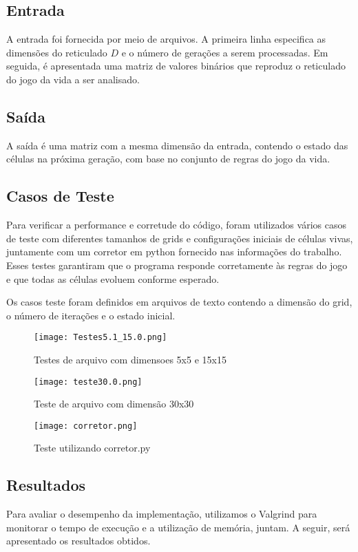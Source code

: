\documentclass[a4paper,12pt]{article}
\begin{document}
\subsection{Entrada}
A entrada foi fornecida por meio de arquivos. A primeira linha especifica as dimensões do reticulado \(D\) e o número de gerações a serem processadas. Em seguida, é apresentada uma matriz de valores binários que reproduz o reticulado do jogo da vida a ser analisado.

\subsection{Saída}
A saída é uma matriz com a mesma dimensão da entrada, contendo o estado das células na próxima geração, com base no conjunto de regras do jogo da vida.

\subsection{Casos de Teste}
Para verificar a performance e corretude do código, foram utilizados vários casos de teste com diferentes tamanhos de grids e configurações iniciais de células vivas, juntamente com um corretor em python fornecido nas informações do trabalho. Esses testes garantiram que o programa responde corretamente às regras do jogo e que todas as células evoluem conforme esperado.

Os casos teste foram definidos em arquivos de texto contendo a dimensão do grid, o número de iterações e o estado inicial.

\begin{figure}[H]
        \centering
        \texttt{[image: Testes5.1\_15.0.png]}
        \caption{Testes de arquivo com dimensoes 5x5 e 15x15}
        \label{fig:enter-label6}
 \end{figure}

\begin{figure} [H]
    \centering
    \texttt{[image: teste30.0.png]}
    \caption{Teste de arquivo com dimensão 30x30}
    \label{fig:enter-label7}
\end{figure}

\begin{figure}[H]
        \centering
        \texttt{[image: corretor.png]}
        \caption{Teste utilizando corretor.py}
        \label{fig:enter-label16}
\end{figure}


\subsection{Resultados}
Para avaliar o desempenho da implementação, utilizamos o Valgrind para monitorar o tempo de execução e a utilização de memória, juntam. A seguir, será apresentado os resultados obtidos.
\end{document}
